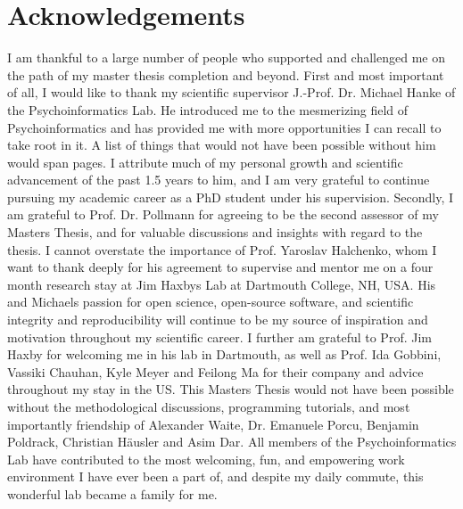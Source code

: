 \documentclass[a4paper, 12pt]{scrreprt}
\begin{document}
\clearpage



\chapter*{Acknowledgements}

I am thankful to a large number of people who supported and challenged me on the path of my master thesis completion and beyond. First and most important of all, I would like to thank my scientific supervisor J.-Prof. Dr. Michael Hanke of the Psychoinformatics Lab. He introduced me to the mesmerizing field of Psychoinformatics and has provided me with more opportunities I can recall to take root in it. A list of things that would not have been possible without him would span pages. I attribute much of my personal growth and scientific advancement of the past 1.5 years to him, and I am very grateful to continue pursuing my academic career as a PhD student under his supervision. \newline
Secondly, I am grateful to Prof. Dr. Pollmann for agreeing to be the second assessor of my Masters Thesis, and for valuable discussions and insights with regard to the thesis.\newline
I cannot overstate the importance of Prof. Yaroslav Halchenko, whom I want to thank deeply for his agreement to supervise and mentor me on a four month research stay at Jim Haxbys Lab at Dartmouth College, NH, USA. His and Michaels passion for open science, open-source software, and scientific integrity and reproducibility will continue to be my source of inspiration and motivation throughout my scientific career.\newline
I further am grateful to Prof. Jim Haxby for welcoming me in his lab in Dartmouth, as well as Prof. Ida Gobbini, Vassiki Chauhan, Kyle Meyer and Feilong Ma for their company and advice throughout my stay in the US. \newline
This Masters Thesis would not have been possible without the methodological discussions, programming tutorials, and most importantly friendship of Alexander Waite, Dr. Emanuele Porcu, Benjamin Poldrack, Christian Häusler and Asim Dar. All members of the Psychoinformatics Lab have contributed to the most welcoming, fun, and empowering work environment I have ever been a part of, and despite my daily commute, this wonderful lab became a family for me. \newline
\end{document}
